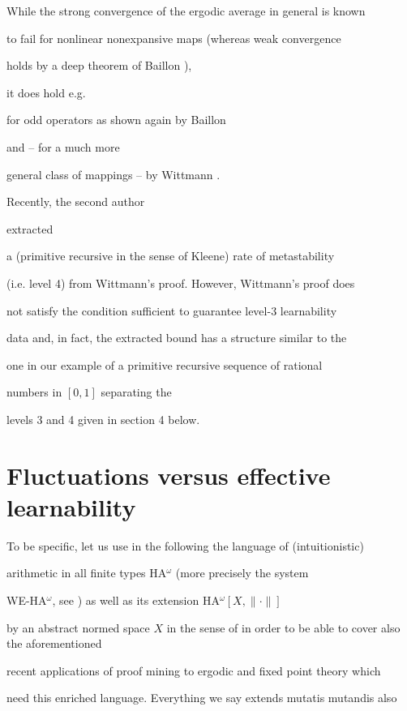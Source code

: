 \documentclass[1p]{elsarticle}
\theoremstyle{plain}
\theoremstyle{definition}
\theoremstyle{remark}
\theoremstyle{definition}
\begin{document}
While the strong convergence of the ergodic average in general is known 

to fail for nonlinear nonexpansive maps (whereas weak convergence 

holds by a deep theorem of Baillon \cite{Baillon(75)}), 

it does hold e.g. 

for odd operators as shown again by Baillon \cite{Baillon(76)} 

and -- for a much more 

general class of mappings -- by Wittmann \cite{Wittmann(90)}. 

Recently, the second author 

\cite{Safarik(11)} extracted 

a (primitive recursive in the sense of Kleene) rate of metastability 

(i.e. level 4) from Wittmann's proof. However, Wittmann's proof does 

not satisfy the condition sufficient to guarantee level-3 learnability 

data and, in fact, the extracted bound has a structure similar to the 

one in our example of a primitive recursive sequence of rational 

numbers in $[0,1]$ separating the 

levels 3 and 4 given in section 4 below. 







\section{Fluctuations versus effective learnability}

To be specific, let us use in the following the language of (intuitionistic) 

arithmetic in all finite types HA$^{\omega}$ (more precisely the system 

WE-HA$^{\omega}$, see \cite{Kohlenbach(book)}) as well as its extension HA$^{\omega}[X,\|\cdot\|]$ 

by an abstract normed space $X$ in the sense of \cite{Kohlenbach(metapaper),GerKoh06,Kohlenbach(book)} in order to be able to cover also the aforementioned 

recent applications of proof mining to ergodic and fixed point theory which 

need this enriched language. Everything we say extends mutatis mutandis also 
\end{document}
